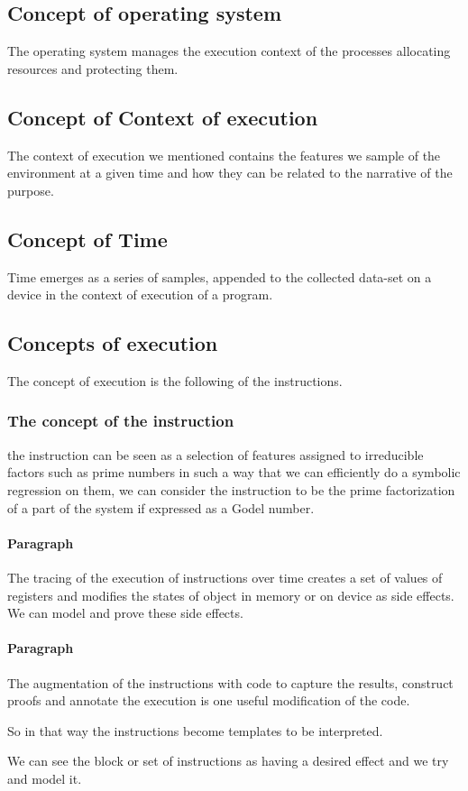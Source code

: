 \documentclass{article}
\begin{document}
\subsection{Concept of operating system}
The operating system manages the execution context of the processes
allocating resources and protecting them.

\subsection{Concept of Context of execution}

The context of execution we mentioned contains the features we sample of the
environment at a given time and how they can be related to the narrative of the purpose.

\subsection{Concept of Time}

Time emerges as a series of samples, appended to the collected data-set
on a device in the context of execution of a program.

\subsection{Concepts of execution}
The concept of execution is the following of
the instructions.

\subsubsection{The concept of the instruction}
the instruction can be seen as a selection of features assigned to irreducible factors such as prime numbers in such a way that we can efficiently do a symbolic regression on them, we can consider the instruction to be the prime factorization of a part of the system if expressed as a Godel number.

\paragraph{Paragraph}

The tracing of the execution of instructions over time
creates a set of values of registers and modifies the states
of object in memory or on device as side effects.
We can model and prove these side effects.

\paragraph{Paragraph}

The augmentation of the instructions with code
to capture the results, construct proofs and annotate the execution
is one useful modification of the code. 

So in that way the instructions become templates to be interpreted.

We can see the block or set of instructions as having a desired effect
and we try and model it. 


 
\end{document}
